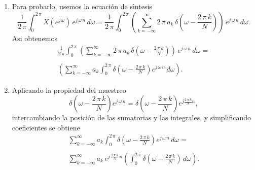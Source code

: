 \begin{enumerate}
\item Para probarlo, usemos la ecuaci\'{o}n de s\'{\i}ntesis 
\begin{equation}
\frac{1}{2 \, \pi }\int_{0}^{2 \, \pi}X\left( e^{j \, \omega }\right) \, e^{j \, \omega \, n}\, d\omega =
\frac{1}{2 \, \pi }\int_{0}^{2 \, \pi} 
  \left( 
    \sum_{k=-\infty }^{\infty} 2 \, \pi \, a_{k} \, \delta \left( \omega -\frac{2 \, \pi \, k}{N} \right) 
  \right) \, e^{j \, \omega \, n}\, d\omega .
\end{equation}
Asi obtenemos
\begin{equation}
  \begin{array}{l}
    \frac{1}{2 \, \pi }\int_{0}^{2 \, \pi}
    \left( \sum_{k=-\infty }^{\infty }
      2 \, \pi \, a_{k} \, \delta \left( \omega -\frac{2 \, \pi \, k}{N}\right) 
    \right) \, e^{j \, \omega \, n}\, d\omega = \\
\\
    \left( \sum_{k=-\infty }^{\infty }
      a_{k}\int_{0}^{2 \, \pi}\delta 
      \left( \omega -\frac{2 \, \pi \, k}{N}\right) e^{j \, \omega \, n}\, d\omega 
    \right).
  \end{array}
\end{equation}

\item Aplicando la propiedad del muestreo 
\begin{equation}
  \delta \left( \omega -\frac{2 \, \pi \, k}{N}\right) e^{j \, \omega \, n} = 
  \delta \left( \omega -\frac{2 \, \pi \, k}{N}\right) e^{j \frac{2 \, \pi \, k}{N} n},
\end{equation}
intercambiando la posici\'{o}n de las sumatorias y las integrales, y simplificando coeficientes
se obtiene
\begin{equation}
\begin{array}{l}
\sum_{k=-\infty }^{\infty }
a_{k}\int_{0}^{2 \, \pi }\delta \left( \omega -\frac{2 \, \pi \, k}{N}\right) e^{j \, \omega \, n}\, d\omega  = \\
\\
\sum_{k=-\infty}^{\infty }
a_{k} \, e^{j \, \frac{2 \, \pi \, k}{N} \, n}
\left( \int_{0}^{2 \, \pi}\delta \left(\omega -\frac{2 \, \pi \, k}{N}\right) \, d\omega \right).
\end{array}
\end{equation}


\end{enumerate}
